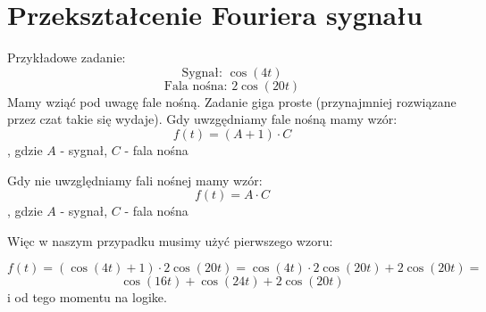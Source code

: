\documentclass{article}
\begin{document}
\section{Przekształcenie Fouriera sygnału}
Przykładowe zadanie:
\[
    \text{Sygnał: }\cos (4t)
\]
\[
    \text{Fala nośna: }2 \cos(20t)
\]
Mamy wziąć pod uwagę fale nośną.
Zadanie giga proste (przynajmniej rozwiązane przez czat takie się wydaje).
Gdy uwzgędniamy fale nośną mamy wzór:
\[
    f(t)=(A + 1) \cdot C
\]
, gdzie $A$ - sygnał, $C$ - fala nośna

Gdy nie uwzględniamy fali nośnej mamy wzór:
\[
    f(t)=A \cdot C
\]
, gdzie $A$ - sygnał, $C$ - fala nośna

Więc w naszym przypadku musimy użyć pierwszego wzoru:

\[
    f(t) = (\cos(4t) + 1) \cdot 2\cos(20t) = \cos(4t) \cdot 2\cos(20t) + 2\cos(20t) = 
\]
\[
    \cos(16t) + \cos(24t) + 2\cos(20t)
\]
i od tego momentu na logike. 
\end{document}
